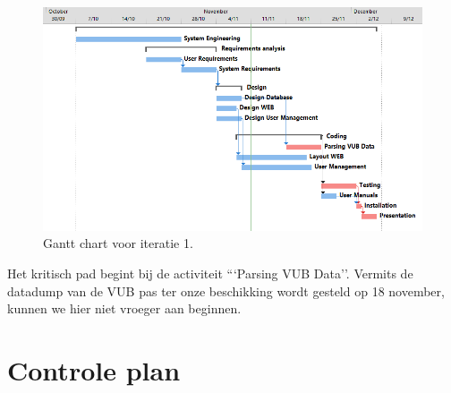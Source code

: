 \begin{figure} [H]
	\centering
	\includegraphics[width = \textwidth]{ManagerialProcess/GanttChartIT1.png}	
	\caption{Gantt chart voor iteratie 1.}
	\label{fig:GantChartIT1}
\end{figure}
Het kritisch pad begint bij de activiteit ```Parsing VUB Data''.  Vermits de datadump van de VUB pas ter onze beschikking wordt gesteld op 18 november, kunnen we hier niet vroeger aan beginnen.

\section{Controle plan}
